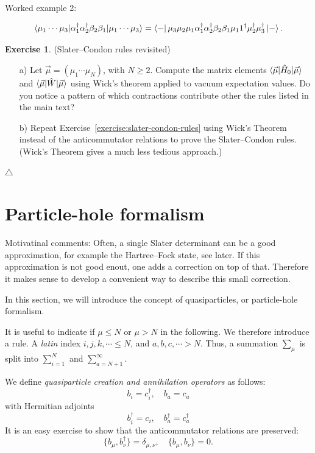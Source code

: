 \documentclass{report}
\theoremstyle{plain}
\theoremstyle{definition}
\newtheorem{exerc}{Exercise}[chapter]
\newcommand\xqed[1]{%
  \leavevmode\unskip\penalty9999 \hbox{}\nobreak\hfill
  \quad\hbox{#1}}
\newcommand\demo{\xqed{$\triangle$}}
\newenvironment{exercise}{\bigskip\begin{exerc}}{\demo\end{exerc}\bigskip}
\begin{document}
Worked example 2:

\begin{equation}
  \braket{\mu_1\cdots\mu_3|\alpha_1^\dag \alpha_2^\dag \beta_2 \beta_1 | \mu_1\cdots \mu_3} = \bra{-} \mu_3
\mu_2  \mu_1 \alpha_1^\dag \alpha_2^\dag \beta_2 \beta_1 \mu_11^\dag \mu_2^\dag \mu_3^\dag
  \ket{-}.
\end{equation}



\begin{exercise}(Slater--Condon rules revisited)
  \begin{enumerate}
  \item[a)]
    Let $\vec{\mu}=(\mu_1\cdots \mu_N)$, with $N \geq 2$. Compute the
    matrix elements $\braket{\vec{\mu}|\hat{H}_0|\vec{\mu}}$ and
    $\braket{\vec{\mu}|\hat{W}|\vec{\mu}}$ using Wick's theorem
    applied to vacuum expectation values. Do you notice a pattern of
    which contractions contribute other the rules listed in the main text?
  \item[b)]
    Repeat Exercise~\ref{exercise:slater-condon-rules} using Wick's
    Theorem instead of the anticommutator relations to prove the
    Slater--Condon rules. (Wick's Theorem
    gives a much less tedious approach.)
  \end{enumerate}
\end{exercise}



\section{Particle-hole formalism}


Motivatinal comments: Often, a single Slater determinant can be a good
approximation, for example the Hartree--Fock state, see later. If this
approximation is not good enout, one adds a correction on top of
that. Therefore it makes sense to develop a convenient way to describe
this small correction.

In this section, we will introduce the concept of quasiparticles, or particle-hole
formalism.

It is useful to indicate if $\mu \leq N$ or $\mu>N$ in the
following. We therefore introduce a rule. A \emph{latin} index
$i,j,k,\cdots \leq N$, and $a,b,c,\cdots > N$. Thus, a summation
$\sum_\mu$ is split into $\sum_{i=1}^N$ and $\sum_{a=N+1}^\infty$.

We define \emph{quasiparticle creation and annihilation operators} as follows:
\begin{equation}
  b_i = c^\dag_i, \quad b_a = c_a
\end{equation}
with Hermitian adjoints
\begin{equation}
  b^\dag_i = c_i, \quad b^\dag_a = c^\dag_a
\end{equation}
It is an easy exercise to show that the anticommutator relations are
preserved:
\begin{equation}
  \{ b_\mu, b^\dag_\nu \} = \delta_{\mu,\nu}, \quad \{ b_\mu, b_\nu \}
  = 0 .
\end{equation}
\end{document}
